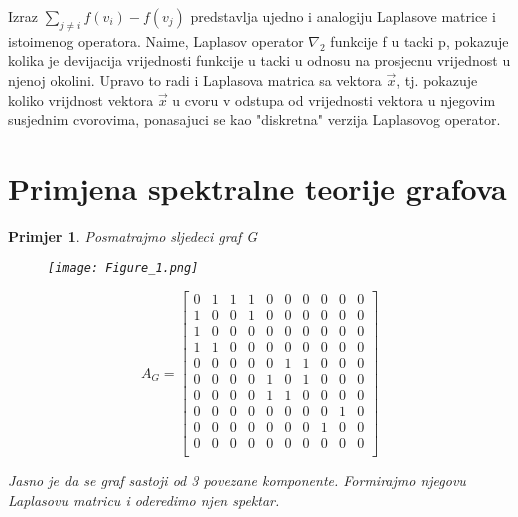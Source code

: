 \documentclass[11pt]{article}
\newtheorem{example}{Primjer}
\begin{document}
	Izraz $\sum_{ j \neq i}  f(v_i) - f(v_j)$ predstavlja ujedno i analogiju Laplasove matrice i istoimenog operatora. Naime, Laplasov operator
	$\nabla_2$ funkcije f u tacki p, pokazuje kolika je devijacija vrijednosti funkcije u tacki u odnosu na prosjecnu vrijednost u njenoj okolini.
	 Upravo to radi i Laplasova matrica sa vektora $\vec{x}$, tj. pokazuje koliko vrijdnost vektora $\vec{x}$ u cvoru v odstupa od vrijednosti
	vektora u njegovim susjednim cvorovima, ponasajuci se kao "diskretna" verzija Laplasovog operator.

	\section{Primjena spektralne teorije grafova}

	\begin{example}
		Posmatrajmo sljedeci graf G
		\begin{figure}[h]
			\centering
			\texttt{[image: Figure\_1.png]}
		\end{figure}
		\[
		A_G =
		\begin{bmatrix}
			0  &  1  &  1  &  1  &  0  & 0  &  0  &  0  &  0  &  0\\
			1  &  0  &  0  &  1  &  0  & 0  &  0  &  0  &  0  &  0\\
			1  &  0  &  0  &  0  &  0  & 0  &  0  &  0  &  0  &  0\\
			1  &  1  &  0  &  0  &  0  & 0  &  0  &  0  &  0  &  0\\
			0  &  0  &  0  &  0  &  0  & 1  &  1  &  0  &  0  &  0\\
			0  &  0  &  0  &  0  &  1  & 0  &  1  &  0  &  0  &  0\\
			0  &  0  &  0  &  0  &  1  & 1  &  0  &  0  &  0  &  0\\
			0  &  0  &  0  &  0  &  0  & 0  &  0  &  0  &  1  &  0\\
			0  &  0  &  0  &  0  &  0  & 0  &  0  &  1  &  0  &  0\\
			0  &  0  &  0  &  0  &  0  & 0  &  0  &  0  &  0  &  0\\
		\end{bmatrix}
		\]

		Jasno je da se graf sastoji od 3 povezane komponente. Formirajmo njegovu Laplasovu matricu i oderedimo njen spektar.


\end{example}
\end{document}
